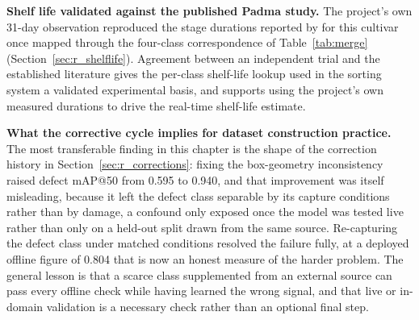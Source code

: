 \textbf{Shelf life validated against the published Padma study.} The project's own 31-day observation reproduced the stage durations reported by \citet{abekoon2024} for this cultivar once mapped through the four-class correspondence of Table~\ref{tab:merge} (Section~\ref{sec:r_shelflife}). Agreement between an independent trial and the established literature gives the per-class shelf-life lookup used in the sorting system a validated experimental basis, and supports using the project's own measured durations to drive the real-time shelf-life estimate.

\textbf{What the corrective cycle implies for dataset construction practice.} The most transferable finding in this chapter is the shape of the correction history in Section~\ref{sec:r_corrections}: fixing the box-geometry inconsistency raised defect mAP@50 from 0.595 to 0.940, and that improvement was itself misleading, because it left the defect class separable by its capture conditions rather than by damage, a confound only exposed once the model was tested live rather than only on a held-out split drawn from the same source. Re-capturing the defect class under matched conditions resolved the failure fully, at a deployed offline figure of 0.804 that is now an honest measure of the harder problem. The general lesson is that a scarce class supplemented from an external source can pass every offline check while having learned the wrong signal, and that live or in-domain validation is a necessary check rather than an optional final step.

\clearpage
